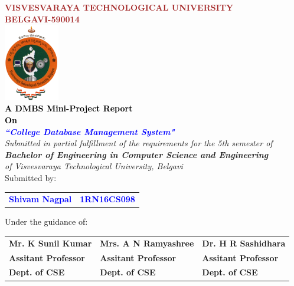 
\begin{titlepage}
\begin{center}
\break\break
\textup{\large {\textcolor{brown}{\bf VISVESVARAYA TECHNOLOGICAL UNIVERSITY} \\ {\textcolor{brown}{\bf BELGAVI-590014}}}}\\[0.1in]
\includegraphics[width=0.18\textwidth]{./VTU.png}\\[0.1in]
\textup{\small {\textcolor{black}{\textbf {A DMBS Mini-Project Report} \\ {\textbf {On}}}}} \\[0.2in]
\textup{\large {\textcolor{blue}{\textbf {\textit {``College Database Management System"}}}}} \\[0.2in]
\textup{{\textit {Submitted in partial fulfillment of the requirements for the 5th semester of} \\ {\textbf {\textit {Bachelor of Engineering in Computer Science and Engineering}} \\ \textit {of Visvesvaraya Technological University, Belgavi}}}}\\[0.15in]
\textup{Submitted by:}
\break\break
\begin{tabular}{l  l}
\textcolor{blue}{\textbf{Shivam Nagpal}} & \textcolor{blue}{\hspace{2.7cm}\textbf{1RN16CS098}}\\[0.3in]

\end{tabular}
\break\break\break\break
\textup{\normalsize {\textcolor{black}{ Under the guidance of:}}}\break\break
\begin{tabular}{l l l}
\textbf{Mr. K Sunil Kumar} & \hspace{0.7cm}\textbf{Mrs. A N Ramyashree} & \hspace{0.7cm}\textbf{Dr. H R Sashidhara}\\
\textbf{Assitant Professor} & \hspace{0.7cm}\textbf{Assitant Professor}  & \hspace{0.7cm}\textbf{Assitant Professor}\\
\textbf{Dept. of CSE} & \hspace{0.7cm}\textbf{Dept. of CSE}  & \hspace{0.7cm}\textbf{Dept. of CSE}\\[0.2in]
\end{tabular}


\end{center}
\end{titlepage}
